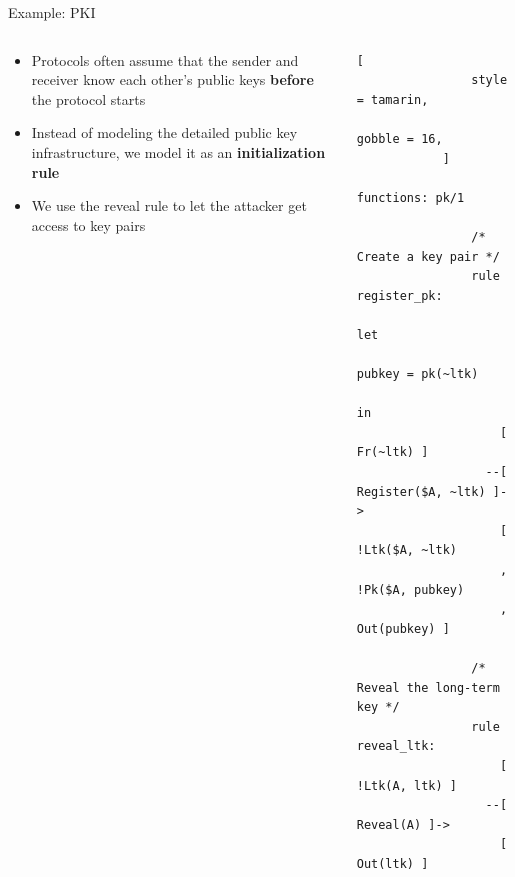 \documentclass[11pt,aspectratio=169]{beamer}
\begin{document}
\begin{frame}[fragile]{Example: PKI}
    \begin{columns}
        \begin{column}{0.55\textwidth}
            \begin{itemize}
                \item Protocols often assume that the sender and receiver know 
                      each other's public keys \textbf{before} the protocol 
                      starts
                \item Instead of modeling the detailed public key 
                      infrastructure, we model it as an
                      \textbf{initialization rule}
                \item We use the reveal rule to let the attacker get access to 
                      key pairs
            \end{itemize}
        \end{column}
        \begin{column}{0.45\textwidth}
            \begin{lstlisting}[
                style = tamarin,
                gobble = 16,
            ]
                functions: pk/1

                /* Create a key pair */
                rule register_pk:
                    let
                        pubkey = pk(~ltk)
                    in
                    [ Fr(~ltk) ]
                  --[ Register($A, ~ltk) ]->
                    [ !Ltk($A, ~ltk)
                    , !Pk($A, pubkey)
                    , Out(pubkey) ]

                /* Reveal the long-term key */
                rule reveal_ltk:
                    [ !Ltk(A, ltk) ]
                  --[ Reveal(A) ]->
                    [ Out(ltk) ]
            \end{lstlisting}
        \end{column}
    \end{columns}
\end{frame}
\end{document}
